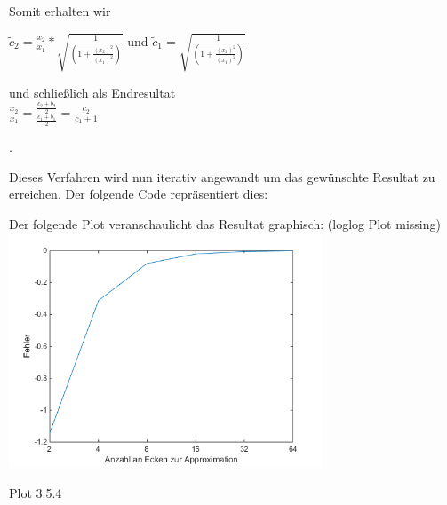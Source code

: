 \documentclass[a4paper,11pt,bibliography=totoc,listof=totoc,headinclude=true,cleardoublepage=empty,oneside]{scrbook}
\begin{document}
				
			\vspace{-2mm}		
					Somit erhalten wir  \\
					\vspace{7mm}
					
					\centerline
					{$\tilde c_2=\frac{x_2}{x_1}* \sqrt{\frac{1}{(1+\frac{(x_2)^2}{(x_1)^2})}}$ und
				$\tilde c_1 = \sqrt{\frac{1}{(1+\frac{(x_2)^2}{(x_1)^2})}}$}
					
				\vspace{3mm}
					
					und schließlich als Endresultat \\
			\vspace{5mm}
					\hspace{4cm}$\frac{x_2}{x_1}=$$\frac{\frac{c_2+b_2}{2}}{\frac{c_1+b_1}{2}}$$=\frac{c_2}{c_1+1}$
						
						
						
					
						\color{change2}.
					
					\vspace{2mm}
						
					Dieses Verfahren wird nun iterativ angewandt um das gewünschte Resultat zu erreichen.
					\vspace{3mm}
					Der folgende Code repräsentiert dies:
					
					
						
					\color{change}
				\lstset{ 
					language=Matlab, 
					showstringspaces=false}
				
				 
				
				
				\color{change2}
				Der folgende Plot veranschaulicht das Resultat graphisch: (loglog Plot missing)
				\vspace{-2mm}	
						\centering
						\includegraphics[width=0.7\textwidth]{plot4.png} \\
						\vspace{2mm}
						\centerline{Plot 3.5.4}
						\label{fig:Bild1}
					
					
				
				
		
		
	
			
	
	
		
	
			 
		
	
	
\end{document}
